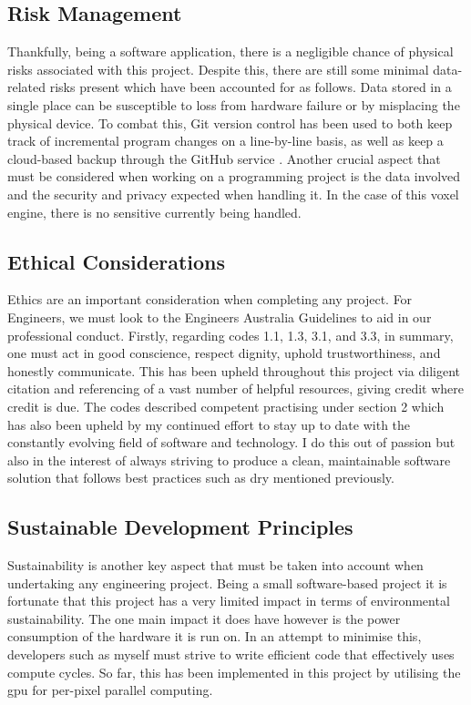 \documentclass[titlepage]{article}
\begin{document}
\subsection{Risk Management}
Thankfully, being a software application, there is a negligible chance of physical risks associated with this project. Despite this, there are still some minimal data-related risks present which have been accounted for as follows. Data stored in a single place can be susceptible to loss from hardware failure or by misplacing the physical device. To combat this, Git version control has been used to both keep track of incremental program changes on a line-by-line basis, as well as keep a cloud-based backup through the GitHub service \cite{github}. Another crucial aspect that must be considered when working on a programming project is the data involved and the security and privacy expected when handling it. In the case of this voxel engine, there is no sensitive currently being handled.

\subsection{Ethical Considerations}
Ethics are an important consideration when completing any project. For Engineers, we must look to the Engineers Australia Guidelines \cite{ethics} to aid in our professional conduct. Firstly, regarding codes 1.1, 1.3, 3.1, and 3.3, in summary, one must act in good conscience, respect dignity, uphold trustworthiness, and honestly communicate. This has been upheld throughout this project via diligent citation and referencing of a vast number of helpful resources, giving credit where credit is due. The codes described competent practising under section 2 which has also been upheld by my continued effort to stay up to date with the constantly evolving field of software and technology. I do this out of passion but also in the interest of always striving to produce a clean, maintainable software solution that follows best practices such as \gls{dry} mentioned previously.

\subsection{Sustainable Development Principles}
Sustainability is another key aspect that must be taken into account when undertaking any engineering project. Being a small software-based project it is fortunate that this project has a very limited impact in terms of environmental sustainability. The one main impact it does have however is the power consumption of the hardware it is run on. In an attempt to minimise this, developers such as myself must strive to write efficient code that effectively uses compute cycles. So far, this has been implemented in this project by utilising the \gls{gpu} for per-pixel parallel computing.
\end{document}
